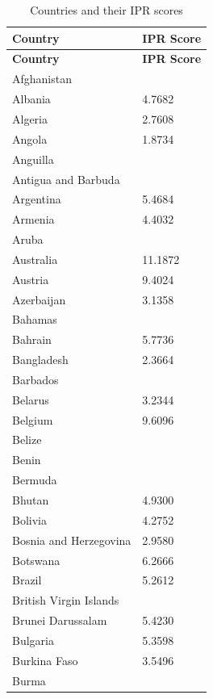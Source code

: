 \documentclass[12pt]{article}
\begin{document}
\begin{longtable}{|p{}|p{}|}
\caption{Countries and their IPR scores \citep{Lesser2010}\label{long}}\\
 
 \hline\textbf{Country}&\textbf{IPR Score}\\\hline
 \endfirsthead
 
 \hline\textbf{Country}&\textbf{IPR Score}\\\hline
 \endhead
 
 \hline
 \endfoot
 
 \hline
 \endlastfoot
Afghanistan& \\\hline
Albania&4.7682 \\\hline
Algeria&2.7608 \\\hline
Angola&1.8734 \\\hline
Anguilla& \\\hline
Antigua and Barbuda& \\\hline
Argentina&5.4684 \\\hline
Armenia&4.4032 \\\hline
Aruba& \\\hline
Australia&11.1872 \\\hline
Austria&9.4024 \\\hline
Azerbaijan&3.1358 \\\hline
Bahamas& \\\hline
Bahrain&5.7736 \\\hline
Bangladesh&2.3664 \\\hline
Barbados& \\\hline
Belarus&3.2344 \\\hline
Belgium&9.6096 \\\hline
Belize& \\\hline
Benin& \\\hline
Bermuda& \\\hline
Bhutan&4.9300 \\\hline
Bolivia&4.2752 \\\hline
Bosnia and Herzegovina&2.9580 \\\hline
Botswana&6.2666 \\\hline
Brazil&5.2612 \\\hline
British Virgin Islands& \\\hline
Brunei Darussalam&5.4230 \\\hline
Bulgaria&5.3598 \\\hline
Burkina Faso&3.5496 \\\hline
Burma& \\\hline

\end{longtable}
\end{document}
